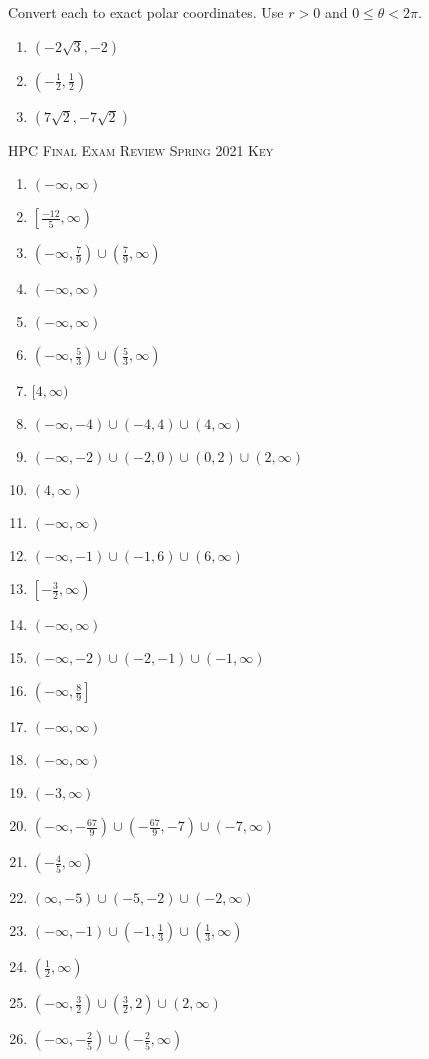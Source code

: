 \documentclass{article}
\newcounter{Review}
\begin{document}
Convert each to exact polar coordinates. Use $r > 0$ and $0 \leq \theta < 2\pi$.
\begin{enumerate}		\setcounter{enumi}{\value{Review}}
	\item $\left(-2\sqrt{3}, -2\right)$
    \item $\left(-\frac{1}{2}, \frac{1}{2}\right)$
    \item $\left(7\sqrt{2}, -7\sqrt{2}\right)$
\end{enumerate}	\setcounter{Review}{\value{enumi}}

\newpage

\textsc{HPC Final Exam Review Spring 2021 Key}

\begin{multicols}{3}
\begin{enumerate}
	\item $(-\infty, \infty)$
	\item $\left[\frac{-12}{5}, \infty\right)$
	\item $\left(-\infty, \frac{7}{9}\right) \cup \left(\frac{7}{9}, \infty\right)$
	\item $(-\infty, \infty)$
	\item $(-\infty, \infty)$
	\item $\left(-\infty, \frac{5}{3}\right) \cup \left(\frac{5}{3}, \infty\right)$
	\item $[4, \infty)$
	\item $(-\infty, -4) \cup (-4, 4) \cup (4, \infty)$
	\item $(-\infty, -2) \cup (-2, 0) \cup (0,2) \cup (2, \infty)$
	\item $(4, \infty)$
	\item $(-\infty, \infty)$
	\item $(-\infty, -1) \cup (-1, 6) \cup (6, \infty)$
	\item $\left[-\frac{3}{2}, \infty\right)$
	\item $(-\infty, \infty)$
	\item $(-\infty, -2) \cup (-2,-1) \cup (-1,\infty)$
	\item $\left(-\infty, \frac{8}{9}\right]$
	\item $(-\infty, \infty)$
    \item $(-\infty, \infty)$
    \item $(-3, \infty)$
    \item $\left(-\infty,-\frac{67}{9}\right) \cup \left(-\frac{67}{9},-7\right) \cup (-7,\infty)$
    \item $\left(-\frac{4}{5}, \infty\right)$
    \item $(\infty,-5) \cup (-5,-2) \cup (-2,\infty)$
    \item $(-\infty, -1) \cup (-1, \frac{1}{3}) \cup (\frac{1}{3}, \infty)$
    \item $(\frac{1}{2}, \infty)$
    \item $\left(-\infty, \frac{3}{2}\right) \cup \left(\frac{3}{2}, 2\right) \cup (2, \infty)$
    \item $\left(-\infty, -\frac{2}{5}\right) \cup \left(-\frac{2}{5}, \infty\right)$
\end{enumerate}
\end{multicols}
\setcounter{Review}{\value{enumi}}
\end{document}
